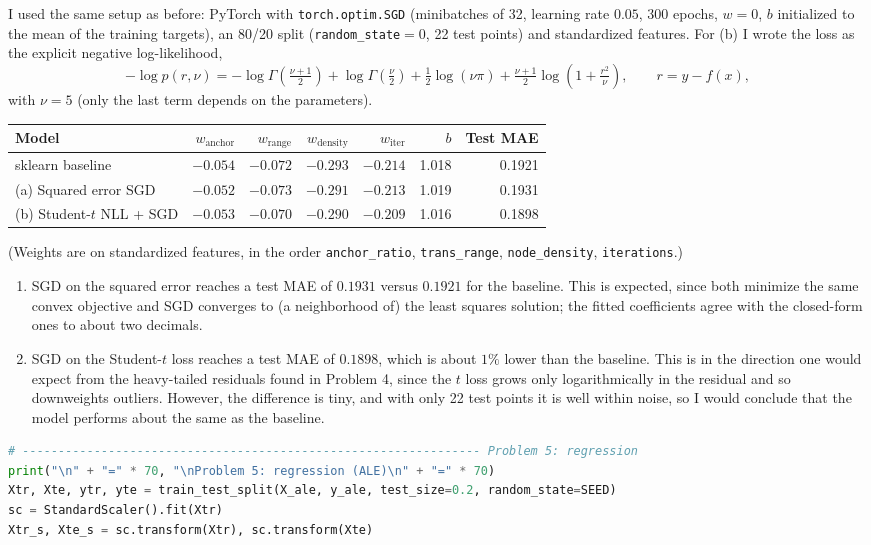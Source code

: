 \documentclass{article}
\begin{document}
\begin{solution}
  I used the same setup as before: PyTorch with \texttt{torch.optim.SGD} (minibatches of 32, learning rate $0.05$, 300 epochs, $w = 0$, $b$ initialized to the mean of the training targets), an 80/20 split (\texttt{random\_state}$=0$, 22 test points) and standardized features. For (b) I wrote the loss as the explicit negative log-likelihood,
  \[
    -\log p(r, \nu) = -\log\Gamma\left(\tfrac{\nu+1}{2}\right) + \log\Gamma\left(\tfrac{\nu}{2}\right) + \tfrac{1}{2}\log(\nu\pi) + \tfrac{\nu+1}{2}\log\left(1 + \tfrac{r^2}{\nu}\right), \qquad r = y - f(x),
  \]
  with $\nu = 5$ (only the last term depends on the parameters).
  \begin{center}
    \small
    \begin{tabular}{l r r r r r r}
      \hline
      Model & $w_{\text{anchor}}$ & $w_{\text{range}}$ & $w_{\text{density}}$ & $w_{\text{iter}}$ & $b$ & Test MAE \\
      \hline
      sklearn baseline & $-0.054$ & $-0.072$ & $-0.293$ & $-0.214$ & 1.018 & 0.1921 \\
      (a) Squared error SGD & $-0.052$ & $-0.073$ & $-0.291$ & $-0.213$ & 1.019 & 0.1931 \\
      (b) Student-$t$ NLL + SGD & $-0.053$ & $-0.070$ & $-0.290$ & $-0.209$ & 1.016 & 0.1898 \\
      \hline
    \end{tabular}
  \end{center}
  (Weights are on standardized features, in the order \texttt{anchor\_ratio}, \texttt{trans\_range}, \texttt{node\_density}, \texttt{iterations}.)
  \begin{enumerate}[label=(\alph*)]
    \item SGD on the squared error reaches a test MAE of $0.1931$ versus $0.1921$ for the baseline. This is expected, since both minimize the same convex objective and SGD converges to (a neighborhood of) the least squares solution; the fitted coefficients agree with the closed-form ones to about two decimals.
    \item SGD on the Student-$t$ loss reaches a test MAE of $0.1898$, which is about $1\%$ lower than the baseline. This is in the direction one would expect from the heavy-tailed residuals found in Problem 4, since the $t$ loss grows only logarithmically in the residual and so downweights outliers. However, the difference is tiny, and with only 22 test points it is well within noise, so I would conclude that the model performs about the same as the baseline.
  \end{enumerate}
  \begin{lstlisting}[language=Python, numbers=none, xleftmargin=0pt, framexleftmargin=0pt, frame=none]
# ---------------------------------------------------------------- Problem 5: regression
print("\n" + "=" * 70, "\nProblem 5: regression (ALE)\n" + "=" * 70)
Xtr, Xte, ytr, yte = train_test_split(X_ale, y_ale, test_size=0.2, random_state=SEED)
sc = StandardScaler().fit(Xtr)
Xtr_s, Xte_s = sc.transform(Xtr), sc.transform(Xte)


\end{lstlisting}
\end{solution}
\end{document}

